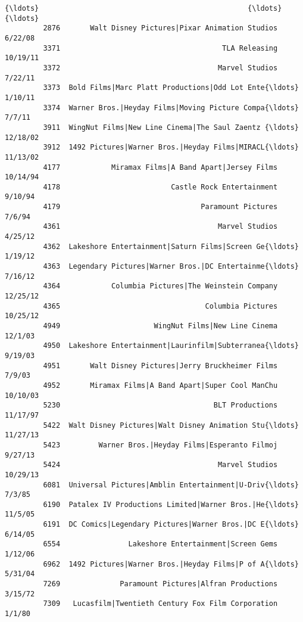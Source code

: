 \documentclass[11pt]{article}
\begin{document}
\begin{Verbatim}[commandchars=\\\{\}]
         {\ldots}                                                 {\ldots}          {\ldots}   
         2876       Walt Disney Pictures|Pixar Animation Studios      6/22/08   
         3371                                      TLA Releasing     10/19/11   
         3372                                     Marvel Studios      7/22/11   
         3373  Bold Films|Marc Platt Productions|Odd Lot Ente{\ldots}      1/10/11   
         3374  Warner Bros.|Heyday Films|Moving Picture Compa{\ldots}       7/7/11   
         3911  WingNut Films|New Line Cinema|The Saul Zaentz {\ldots}     12/18/02   
         3912  1492 Pictures|Warner Bros.|Heyday Films|MIRACL{\ldots}     11/13/02   
         4177            Miramax Films|A Band Apart|Jersey Films     10/14/94   
         4178                          Castle Rock Entertainment      9/10/94   
         4179                                 Paramount Pictures       7/6/94   
         4361                                     Marvel Studios      4/25/12   
         4362  Lakeshore Entertainment|Saturn Films|Screen Ge{\ldots}      1/19/12   
         4363  Legendary Pictures|Warner Bros.|DC Entertainme{\ldots}      7/16/12   
         4364            Columbia Pictures|The Weinstein Company     12/25/12   
         4365                                  Columbia Pictures     10/25/12   
         4949                      WingNut Films|New Line Cinema      12/1/03   
         4950  Lakeshore Entertainment|Laurinfilm|Subterranea{\ldots}      9/19/03   
         4951       Walt Disney Pictures|Jerry Bruckheimer Films       7/9/03   
         4952       Miramax Films|A Band Apart|Super Cool ManChu     10/10/03   
         5230                                    BLT Productions     11/17/97   
         5422  Walt Disney Pictures|Walt Disney Animation Stu{\ldots}     11/27/13   
         5423         Warner Bros.|Heyday Films|Esperanto Filmoj      9/27/13   
         5424                                     Marvel Studios     10/29/13   
         6081  Universal Pictures|Amblin Entertainment|U-Driv{\ldots}       7/3/85   
         6190  Patalex IV Productions Limited|Warner Bros.|He{\ldots}      11/5/05   
         6191  DC Comics|Legendary Pictures|Warner Bros.|DC E{\ldots}      6/14/05   
         6554                Lakeshore Entertainment|Screen Gems      1/12/06   
         6962  1492 Pictures|Warner Bros.|Heyday Films|P of A{\ldots}      5/31/04   
         7269              Paramount Pictures|Alfran Productions      3/15/72   
         7309   Lucasfilm|Twentieth Century Fox Film Corporation       1/1/80   
         

\end{Verbatim}
\end{document}
